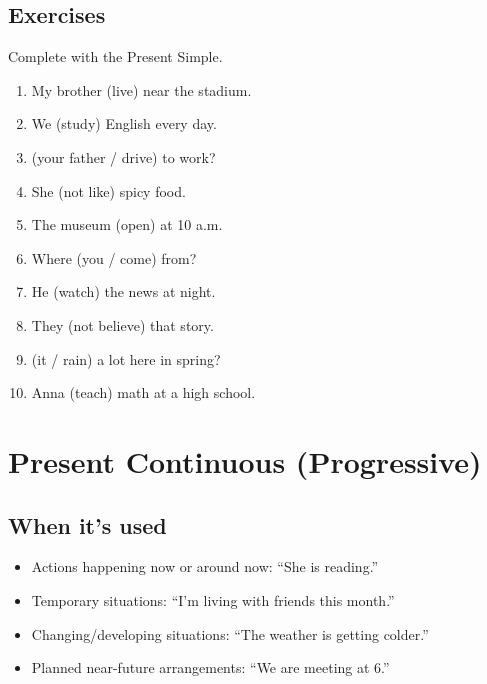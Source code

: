 \documentclass[11pt,a4paper]{article}
\begin{document}
\subsection*{Exercises}
Complete with the Present Simple.
\begin{enumerate}
  \item My brother \underline{\hspace{2.5cm}} (live) near the stadium.
  \item We \underline{\hspace{2.5cm}} (study) English every day.
  \item \underline{\hspace{2.5cm}} (your father / drive) to work?
  \item She \underline{\hspace{2.5cm}} (not like) spicy food.
  \item The museum \underline{\hspace{2.5cm}} (open) at 10 a.m.
  \item Where \underline{\hspace{2.5cm}} (you / come) from?
  \item He \underline{\hspace{2.5cm}} (watch) the news at night.
  \item They \underline{\hspace{2.5cm}} (not believe) that story.
  \item \underline{\hspace{2.5cm}} (it / rain) a lot here in spring?
  \item Anna \underline{\hspace{2.5cm}} (teach) math at a high school.
\end{enumerate}

\section{Present Continuous (Progressive)}
\subsection*{When it’s used}
\begin{itemize}
  \item Actions happening now or around now: ``She is reading.''
  \item Temporary situations: ``I’m living with friends this month.''
  \item Changing/developing situations: ``The weather is getting colder.''
  \item Planned near-future arrangements: ``We are meeting at 6.''
\end{itemize}
\end{document}
